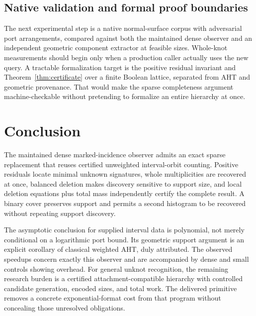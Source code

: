 \documentclass[11pt,letterpaper]{article}
\begin{document}
\subsection{Native validation and formal proof boundaries}
The next experimental step is a native normal-surface corpus with adversarial
port arrangements, compared against both the maintained dense observer and
an independent geometric component extractor at feasible sizes. Whole-knot
measurements should begin only when a production caller actually uses the
new query. A tractable formalization target is the positive residual invariant
and Theorem~\ref{thm:certificate} over a finite Boolean lattice, separated from
AHT and geometric provenance. That would make the sparse completeness argument
machine-checkable without pretending to formalize an entire hierarchy at once.

\section{Conclusion}
The maintained dense marked-incidence observer admits an exact sparse
replacement that reuses certified unweighted interval-orbit counting.
Positive residuals locate minimal unknown signatures, whole multiplicities
are recovered at once, balanced deletion makes discovery sensitive to support
size, and local deletion equations plus total mass independently certify the
complete result. A binary cover preserves support and permits a second
histogram to be recovered without repeating support discovery.

The asymptotic conclusion for supplied interval data is polynomial, not merely
conditional on a logarithmic port bound. Its geometric support argument is an
explicit corollary of classical weighted AHT, duly attributed. The observed
speedups concern exactly this observer and are accompanied by dense and small
controls showing overhead. For general unknot recognition, the remaining
research burden is a certified attachment-compatible hierarchy with controlled
candidate generation, encoded sizes, and total work. The delivered primitive
removes a concrete exponential-format cost from that program without
concealing those unresolved obligations.

\appendix
\end{document}
